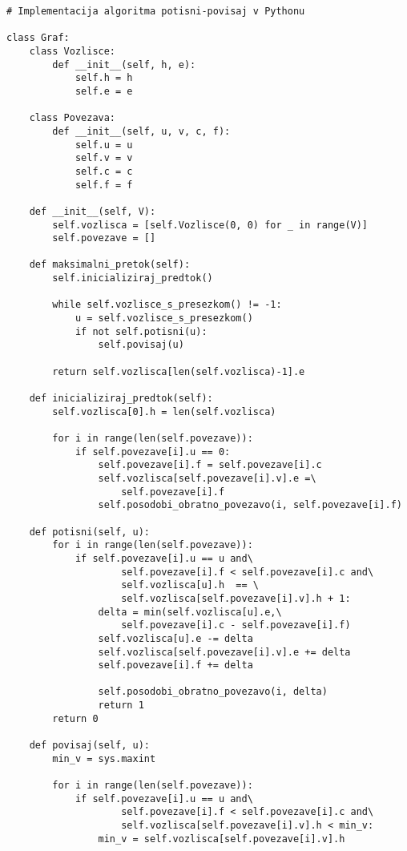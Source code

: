 \documentclass[mat1]{fmfdelo}
\begin{document}
\begin{verbatim}
# Implementacija algoritma potisni-povisaj v Pythonu

class Graf:
    class Vozlisce:
        def __init__(self, h, e):
            self.h = h
            self.e = e
        
    class Povezava:
        def __init__(self, u, v, c, f):
            self.u = u
            self.v = v
            self.c = c
            self.f = f
                
    def __init__(self, V):
        self.vozlisca = [self.Vozlisce(0, 0) for _ in range(V)]
        self.povezave = []
        
    def maksimalni_pretok(self):
        self.inicializiraj_predtok()
        
        while self.vozlisce_s_presezkom() != -1:
            u = self.vozlisce_s_presezkom()
            if not self.potisni(u):
                self.povisaj(u)
                
        return self.vozlisca[len(self.vozlisca)-1].e
        
    def inicializiraj_predtok(self):
        self.vozlisca[0].h = len(self.vozlisca)
        
        for i in range(len(self.povezave)):
            if self.povezave[i].u == 0:
                self.povezave[i].f = self.povezave[i].c
                self.vozlisca[self.povezave[i].v].e =\
                    self.povezave[i].f
                self.posodobi_obratno_povezavo(i, self.povezave[i].f)
    
    def potisni(self, u):
        for i in range(len(self.povezave)):
            if self.povezave[i].u == u and\
                    self.povezave[i].f < self.povezave[i].c and\
                    self.vozlisca[u].h  == \
                    self.vozlisca[self.povezave[i].v].h + 1:
                delta = min(self.vozlisca[u].e,\
                    self.povezave[i].c - self.povezave[i].f)
                self.vozlisca[u].e -= delta
                self.vozlisca[self.povezave[i].v].e += delta
                self.povezave[i].f += delta
                
                self.posodobi_obratno_povezavo(i, delta)
                return 1
        return 0
        
    def povisaj(self, u):
        min_v = sys.maxint
        
        for i in range(len(self.povezave)):
            if self.povezave[i].u == u and\
                    self.povezave[i].f < self.povezave[i].c and\
                    self.vozlisca[self.povezave[i].v].h < min_v:
                min_v = self.vozlisca[self.povezave[i].v].h
        

\end{verbatim}
\end{document}

